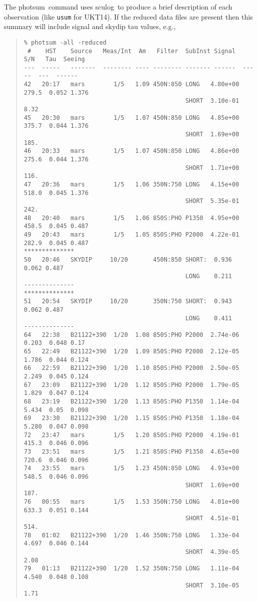\documentclass[twoside,11pt,fleqn]{article}
\newenvironment{myquote}{\begin{quote}\begin{small}}{\end{small}\end{quote}}
\newcommand{\task}[1]{{\sf #1}}
\newcommand{\sculog}{\xref{\task{sculog}}{sun216}{SCULOG}}
\newcommand{\photsum}{\xref{\task{photsum}}{sun216}{PHOTSUM}}
\newcommand{\xref}[3]{#1}
\begin{document}
The \photsum\ command uses \sculog\ to produce a brief description
of each observation (like {\tt usum} for UKT14). If the reduced data
files are present then this summary will include signal and 
\xref{skydip}{sun216}{skydips} tau values, e.g.,
\begin{myquote}
\begin{verbatim}
% photsum -all -reduced
 #    HST    Source   Meas/Int  Am   Filter  SubInst Signal   S/N   Tau  Seeing
---  -----   -------  -------- ---- -------- ------- ------  -----  ---  ------
42   20:17   mars        1/5   1.09 450N:850 LONG   4.80e+00 279.5  0.052 1.376
                                             SHORT  3.10e-01 8.32
45   20:30   mars        1/5   1.07 450N:850 LONG   4.85e+00 375.7  0.044 1.376
                                             SHORT  1.69e+00 185.
46   20:33   mars        1/5   1.07 450N:850 LONG   4.86e+00 275.6  0.044 1.376
                                             SHORT  1.71e+00 116.
47   20:36   mars        1/5   1.06 350N:750 LONG   4.15e+00 518.0  0.045 1.376
                                             SHORT  5.35e-01 242.
48   20:40   mars        1/5   1.06 850S:PHO P1350  4.95e+00 458.5  0.045 0.487
49   20:43   mars        1/5   1.05 850S:PHO P2000  4.22e-01 282.9  0.045 0.487
**************
50   20:46   SKYDIP     10/20       450N:850 SHORT:  0.936          0.062 0.487
                                             LONG    0.211
--------------
**************
51   20:54   SKYDIP     10/20       350N:750 SHORT:  0.943          0.062 0.487
                                             LONG    0.411
--------------
64   22:38   B21122+390  1/20  1.08 850S:PHO P2000  2.74e-06 0.203  0.048 0.17
65   22:49   B21122+390  1/20  1.09 850S:PHO P2000  2.12e-05 1.786  0.044 0.124
66   22:59   B21122+390  1/20  1.10 850S:PHO P2000  2.50e-05 2.249  0.045 0.124
67   23:09   B21122+390  1/20  1.12 850S:PHO P2000  1.79e-05 1.829  0.047 0.124
68   23:19   B21122+390  1/20  1.13 850S:PHO P1350  1.14e-04 5.434  0.05  0.098
69   23:30   B21122+390  1/20  1.15 850S:PHO P1350  1.18e-04 5.280  0.047 0.098
72   23:47   mars        1/5   1.20 850S:PHO P2000  4.19e-01 415.3  0.046 0.096
73   23:51   mars        1/5   1.21 850S:PHO P1350  4.65e+00 720.6  0.046 0.096
74   23:55   mars        1/5   1.23 450N:850 LONG   4.93e+00 548.5  0.046 0.096
                                             SHORT  1.69e+00 187.
76   00:55   mars        1/5   1.53 350N:750 LONG   4.01e+00 633.3  0.051 0.144
                                             SHORT  4.51e-01 514.
78   01:02   B21122+390  1/20  1.46 350N:750 LONG   1.33e-04 4.697  0.046 0.144
                                             SHORT  4.39e-05 2.08
79   01:13   B21122+390  1/20  1.52 350N:750 LONG   1.11e-04 4.540  0.048 0.108
                                             SHORT  3.10e-05 1.71
\end{verbatim}
\end{myquote}
\end{document}
